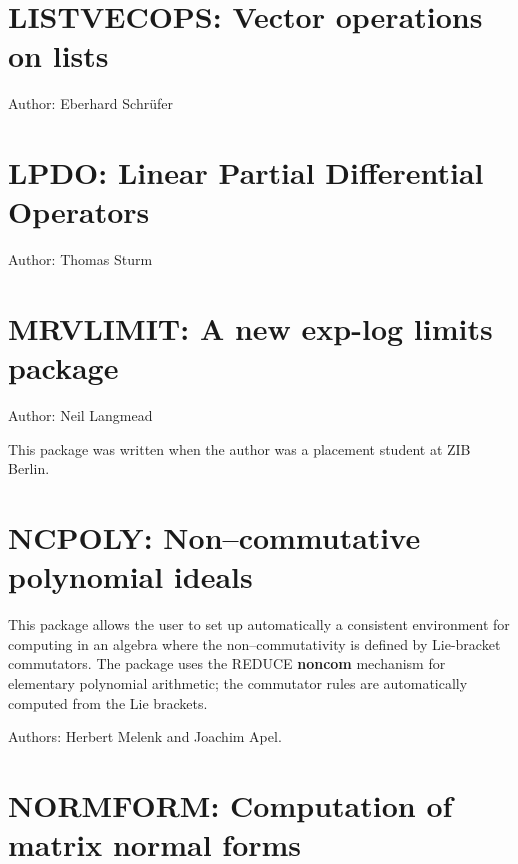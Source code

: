 \section{LISTVECOPS: Vector operations on lists}
\label{LISTVECOPS}

Author: Eberhard Schr\"{u}fer



\newpage

\section{LPDO: Linear Partial Differential Operators}
\label{LPDO}

Author: Thomas Sturm



\newpage

\section{MRVLIMIT: A new exp-log limits package}

Author: Neil Langmead

This package was written when the author was a placement student at ZIB Berlin.



\newpage

\section{NCPOLY: Non--commutative polynomial ideals}

This package allows the user to set up automatically a consistent
environment for computing in an algebra where the non--commutativity is
defined by Lie-bracket commutators.  The package uses the {REDUCE} {\bf
noncom} mechanism for elementary polynomial arithmetic; the commutator
rules are automatically computed from the Lie brackets.

Authors: Herbert Melenk and Joachim Apel.



\newpage

\section{NORMFORM: Computation of matrix normal forms}
\label{NORMFORM}

